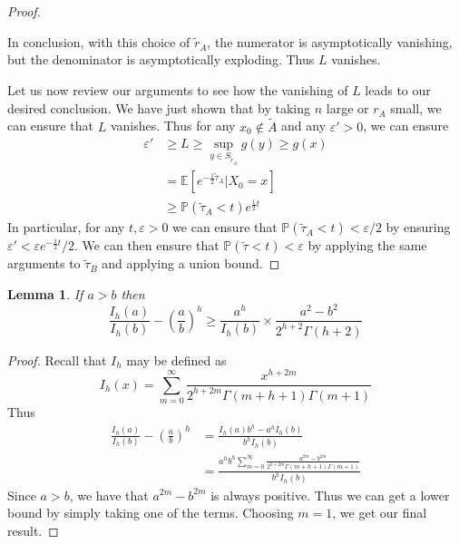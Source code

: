 \documentclass[12pt, nofootinbib,english, amsmath, amssymb, aps, priprint, graphicx,floatfix]{revtex4-1}
\newtheorem{lemma}{Lemma}
\theoremstyle{plain}
\theoremstyle{definition}
\theoremstyle{plain}
\begin{document}
\begin{proof}
\begin{itemize}
    In conclusion, with this choice of $\tilde r_{\dot A}$, the numerator is asymptotically vanishing, but the denominator is asymptotically exploding.  Thus $L$ vanishes.
\end{itemize}

Let us now review our arguments to see how the vanishing of $L$ leads to our desired conclusion.  We have just shown that by taking $n$ large or $r_{\dot A}$ small, we can ensure that $L$ vanishes.  Thus for any $x_0\notin \tilde A$ and any $\varepsilon'>0$, we can ensure
\begin{align*}
\varepsilon' & \geq L \geq \sup_{y \in S_{\tilde r_{\dot A}}} g(y) \geq g(x) \\
            & = \mathbb{E}[e^{-\frac{1}{2}\tilde \tau_A}|X_0=x]\\
            & \geq \mathbb{P}(\tilde \tau_A < t) e^{\frac{1}{2} t}
\end{align*}
In particular, for any $t,\varepsilon>0$ we can ensure that $\mathbb{P}(\tilde \tau_A < t)<\varepsilon/2$ by ensuring $\varepsilon' < \varepsilon e^{-\frac{1}{2} t}/2$.  We can then ensure that $\mathbb{P}(\tilde \tau < t)<\varepsilon$ by applying the same arguments to $\tilde \tau_B$ and applying a union bound.

\end{proof}

\begin{lemma}\label{lem:bessel}
If $a>b$ then
    \[
    \frac{I_h ( a)}{I_h (b)} - \left(\frac{a}{b} \right)^h 
    \geq
    \frac{a^h}{I_h(b)}\times\frac{a^{2} -b^{2}}{2^{h+2}\Gamma(h+2)}
    \]
\end{lemma}
\begin{proof}
Recall that $I_h$ may be defined as 
\[
I_h(x) = \sum_{m=0}^\infty \frac{x^{h+2m}}{2^{h+2m}\Gamma(m+h+1)\Gamma(m+1)}
\]
Thus
\begin{align*}
\frac{I_h ( a)}{I_h (b)} - \left(\frac{a}{b} \right)^h 
    &= \frac{I_h(a)b^h-a^hI_h(b)}{b^hI_h(b)}  \\
    &= \frac{a^hb^h\sum_{m=0}^\infty \frac{a^{2m} -b^{2m}}{2^{h+2m}\Gamma(m+h+1)\Gamma(m+1)}}{b^{h}I_h(b)}
\end{align*}
Since $a>b$, we have that $a^{2m} -b^{2m}$ is always positive.  Thus we can get a lower bound by simply taking one of the terms.  Choosing $m=1$, we get our final result.
\end{proof}

                                                            
\end{document}
